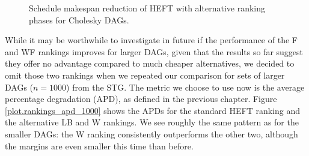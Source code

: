 \documentclass[12pt]{article}
\begin{document}
\begin{figure}
	\centering
	\hspace*{-6em}	
	\caption{Schedule makespan reduction of HEFT with alternative ranking phases for Cholesky DAGs.}	
	\label{plot.fulk_cholesky} 
\end{figure}   

While it may be worthwhile to investigate in future if the performance of the F and WF rankings improves for larger DAGs, given that the results so far suggest they offer no advantage compared to much cheaper alternatives, we decided to omit those two rankings when we repeated our comparison for sets of larger DAGs ($n = 1000$) from the STG. The metric we choose to use now is the average percentage degradation (APD), as defined in the previous chapter. Figure \ref{plot.rankings_apd_1000} shows the APDs for the standard HEFT ranking and the alternative LB and W rankings. We see roughly the same pattern as for the smaller DAGs: the W ranking consistently outperforms the other two, although the margins are even smaller this time than before. 
\end{document}
